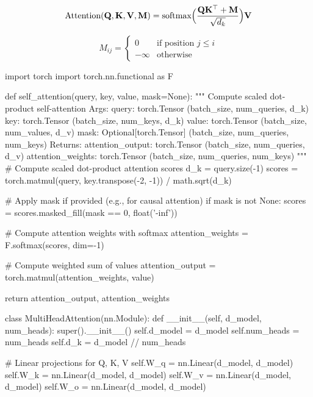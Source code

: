 \begin{equation}\label{eq:masked_attention}
\text{Attention}(\mathbf{Q}, \mathbf{K}, \mathbf{V}, \mathbf{M}) 
= \text{softmax}\Bigl(\frac{\mathbf{Q} \mathbf{K}^\top + \mathbf{M}}{\sqrt{d_k}}\Bigr) \mathbf{V}
\end{equation}

\begin{equation}\label{eq:mask_matrix}
M_{ij} = \begin{cases}
    0 & \text{if position } j \leq i \\
    -\infty & \text{otherwise}
\end{cases}
\end{equation}


\begin{pythoncode}
import torch
import torch.nn.functional as F

def self_attention(query, key, value, mask=None):
    """
    Compute scaled dot-product self-attention
    Args:
        query: torch.Tensor (batch_size, num_queries, d_k)
        key: torch.Tensor (batch_size, num_keys, d_k)
        value: torch.Tensor (batch_size, num_values, d_v)
        mask: Optional[torch.Tensor] (batch_size, num_queries, num_keys)
    Returns:
        attention_output: torch.Tensor (batch_size, num_queries, d_v)
        attention_weights: torch.Tensor (batch_size, num_queries, num_keys)
    """
    # Compute scaled dot-product attention scores
    d_k = query.size(-1)
    scores = torch.matmul(query, key.transpose(-2, -1)) / math.sqrt(d_k)
    
    # Apply mask if provided (e.g., for causal attention)
    if mask is not None:
        scores = scores.masked_fill(mask == 0, float('-inf'))
    
    # Compute attention weights with softmax
    attention_weights = F.softmax(scores, dim=-1)
    
    # Compute weighted sum of values
    attention_output = torch.matmul(attention_weights, value)
    
    return attention_output, attention_weights

class MultiHeadAttention(nn.Module):
    def __init__(self, d_model, num_heads):
        super().__init__()
        self.d_model = d_model
        self.num_heads = num_heads
        self.d_k = d_model // num_heads
        
        # Linear projections for Q, K, V
        self.W_q = nn.Linear(d_model, d_model)
        self.W_k = nn.Linear(d_model, d_model)
        self.W_v = nn.Linear(d_model, d_model)
        self.W_o = nn.Linear(d_model, d_model)
    

\end{pythoncode}
